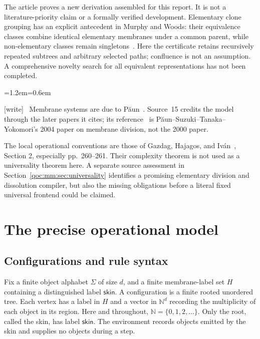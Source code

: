 \documentclass[11pt,letterpaper]{article}
\theoremstyle{definition}
\theoremstyle{remark}
\newcommand{\N}{\mathbb N}
\newcommand{\sk}{\mathsf{skin}}
\newcommand{\wtag}{\textup{[write]}}
\newenvironment{writenote}{\par\smallskip\begin{list}{}{\leftmargin=1.2em\rightmargin=0.6em}\item[]\small\wtag\ }{\end{list}\smallskip}
\begin{document}
The article proves a new derivation assembled for this report. It is not a literature-priority claim or a formally verified development. Elementary clone grouping has an explicit antecedent in Murphy and Woods: their equivalence classes combine identical elementary membranes under a common parent, while non-elementary classes remain singletons~\cite{mm:murphywoods}. Here the certificate retains recursively repeated subtrees and arbitrary selected paths; confluence is not an assumption. A comprehensive novelty search for all equivalent representations has not been completed.

\begin{writenote}
Membrane systems are due to P\u{a}un~\cite{w:paun}. Source~15 credits the model through the later papers it cites; its reference~\cite{mm:paun} is P\u{a}un--Suzuki--Tanaka--Yokomori's 2004 paper on membrane division, not the 2000 paper.
\end{writenote}


The local operational conventions are those of Gazdag, Hajagos, and Iv\'an~\cite{mm:gazdag}, Section 2, especially pp.~260--261. Their complexity theorem is not used as a universality theorem here. A separate source assessment in Section~\ref{qoc:mm:sec:universality} identifies a promising elementary division and dissolution compiler, but also the missing obligations before a literal fixed universal frontend could be claimed.

\section{The precise operational model}\label{qoc:mm:sec:model}
\subsection{Configurations and rule syntax}
Fix a finite object alphabet $\Sigma$ of size $d$, and a finite membrane-label set $H$ containing a distinguished label $\sk$. A configuration is a finite rooted unordered tree. Each vertex has a label in $H$ and a vector in $\N^d$ recording the multiplicity of each object in its region. Here and throughout, $\N=\{0,1,2,\ldots\}$. Only the root, called the skin, has label $\sk$. The environment records objects emitted by the skin and supplies no objects during a step.
\end{document}
